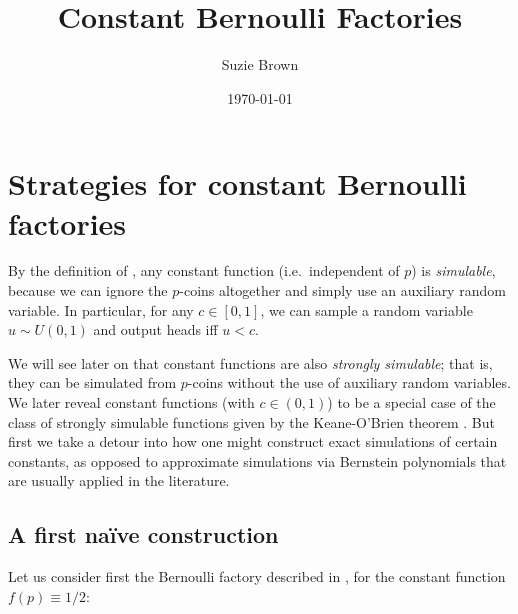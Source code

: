 \documentclass{article}
\title{Constant Bernoulli Factories}
\author{Suzie Brown}
\date{\today}
\theoremstyle{definition}
\begin{document}
\section{Strategies for constant Bernoulli factories}
By the definition of \citet{keane1994}, any constant function (i.e.\ independent of $p$) is \emph{simulable}, because we can ignore the $p$-coins altogether and simply use an auxiliary random variable. In particular, for any $c\in[0,1]$, we can sample a random variable $u \sim U(0,1)$ and output heads iff $u < c$.

We will see later on that constant functions are also \emph{strongly simulable}; that is, they can be simulated from $p$-coins without the use of auxiliary random variables. We later reveal constant functions (with $c\in(0,1)$) to be a special case of the class of strongly simulable functions given by the Keane-O'Brien theorem \citep{keane1994}. But first we take a detour into how one might construct exact simulations of certain constants, as opposed to approximate simulations via Bernstein polynomials that are usually applied in the literature.

\subsection{A first na\"ive construction}
Let us consider first the Bernoulli factory described in \citet{vonneumann1951}, for the constant function $f(p)\equiv 1/2$:
\end{document}
